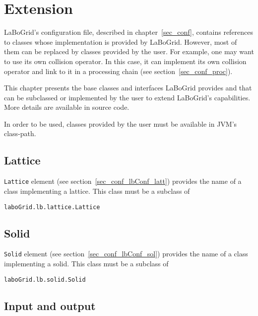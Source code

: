\chapter{Extension}
\label{sec_ext}

LaBoGrid's configuration file, described in chapter~\ref{sec_conf}, contains
references to classes whose implementation is provided by LaBoGrid. However,
most of them can be replaced by classes provided by the user. For example,
one may want to use its own collision operator. In this case, it can
implement its own collision operator and link to it in a processing chain (see
section~\ref{sec_conf_proc}).

This chapter presents the base classes and interfaces LaBoGrid provides and that
can be subclassed or implemented by the user to extend LaBoGrid's capabilities.
More details are available in source code.

In order to be used, classes provided by the user must be available in JVM's
class-path.


\section{Lattice}

\verb|Lattice| element (see section~\ref{sec_conf_lbConf_latt}) provides the
name of a class implementing a lattice. This class must be a subclass of
\begin{center}
\texttt{laboGrid.lb.lattice.Lattice}
\end{center}


\section{Solid}

\verb|Solid| element (see section~\ref{sec_conf_lbConf_sol}) provides the
name of a class implementing a solid. This class must be a subclass of
\begin{center}
\texttt{laboGrid.lb.solid.Solid}
\end{center}


\section{Input and output}

